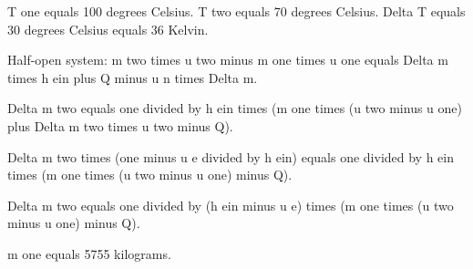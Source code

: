 T one equals 100 degrees Celsius.  
T two equals 70 degrees Celsius.  
Delta T equals 30 degrees Celsius equals 36 Kelvin.  

Half-open system:  
m two times u two minus m one times u one equals Delta m times h ein plus Q minus u n times Delta m.  

Delta m two equals one divided by h ein times (m one times (u two minus u one) plus Delta m two times u two minus Q).  

Delta m two times (one minus u e divided by h ein) equals one divided by h ein times (m one times (u two minus u one) minus Q).  

Delta m two equals one divided by (h ein minus u e) times (m one times (u two minus u one) minus Q).  

m one equals 5755 kilograms.